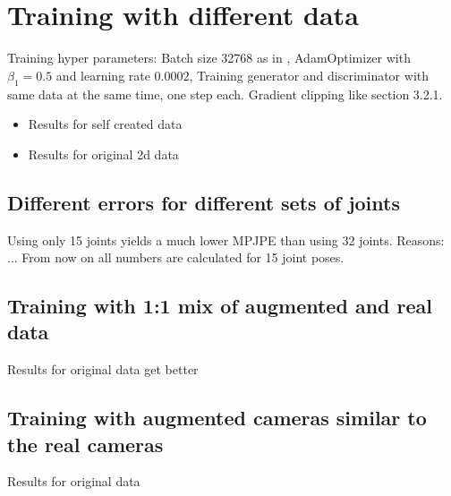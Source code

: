 \section{Training with different data}

Training hyper parameters:
Batch size 32768 as in \cite{drover18}, AdamOptimizer with $\beta_1 = 0.5$ and learning rate $0.0002$, Training generator and discriminator with same data at the same time, one step each. Gradient clipping like \citet{chorowski14} section 3.2.1.


\begin{itemize}
	\item Results for self created data
	\item Results for original 2d data
\end{itemize}

\subsection{Different errors for different sets of joints}
Using only 15 joints yields a much lower MPJPE than using 32 joints. Reasons: ...	
From now on all numbers are calculated for 15 joint poses.

\subsection{Training with 1:1 mix of augmented and real data}
Results for original data get better



\subsection{Training with augmented cameras similar to the real cameras}
Results for original data